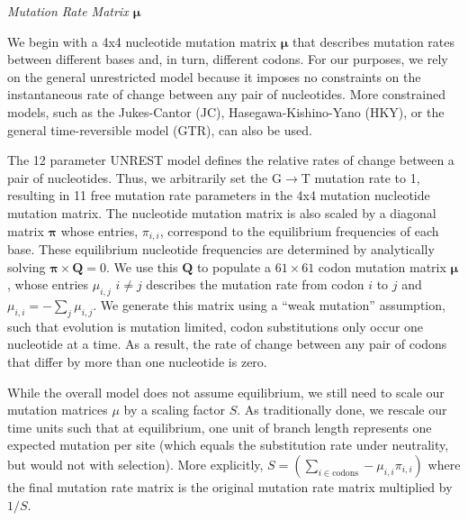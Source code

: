 \documentclass[12pt,letterpaper,fleqn]{article}
\renewcommand{\subsection}[1]{%
\bigskip
\begin{center}
\begin{large}
\normalfont\itshape #1
\end{large}
\end{center}}
\newcommand{\pimatrix}{\ensuremath{\boldsymbol{\pi}}\xspace}
\newcommand{\mumatrix}{\ensuremath{\boldsymbol{\mu}}\xspace}
\newcommand{\Qmatrix}{\ensuremath{\mathbf{Q}}\xspace}
\newcommand{\muij}{\ensuremath{\mu_{i,j}}\xspace}
\begin{document}
\subsection{Mutation Rate Matrix \mumatrix}
We begin with a 4x4 nucleotide mutation matrix \mumatrix that describes mutation rates between different bases and, in turn, different codons.
For our purposes, we rely on the general unrestricted model \citep[UNREST from ][]{Yang1994} because it imposes no constraints on the instantaneous rate of change between any pair of nucleotides.
More constrained models, such as the Jukes-Cantor (JC), Hasegawa-Kishino-Yano (HKY), or the general time-reversible model (GTR), can also be used.

The 12 parameter UNREST model defines the relative rates of change between a pair of nucleotides.
Thus, we arbitrarily set the G$\rightarrow$T mutation rate to 1, resulting in 11 free mutation rate parameters in the 4x4 mutation nucleotide mutation matrix.
The nucleotide mutation matrix is also scaled by a diagonal matrix \pimatrix whose entries, $\pi_{i,i}$, correspond to the equilibrium frequencies of each base.
These equilibrium nucleotide frequencies are determined by analytically solving $\pimatrix \times \Qmatrix = 0$.
We use this \Qmatrix to populate a $61 \times 61$ codon mutation matrix $\mumatrix$, whose entries $\muij$ $i\neq j$ describes the mutation rate from codon $i$ to $j$ and $\mu_{i,i} = - \sum_j \mu_{i,j}$.
We generate this matrix using a ``weak mutation'' assumption, such that evolution is mutation limited, codon substitutions only occur one nucleotide at a time.
As a result, the rate of change between any pair of codons that differ by more than one nucleotide is zero.

While the overall model does not assume equilibrium, we still need to scale our mutation matrices $\mu$ by a scaling factor $S$.
As traditionally done, we rescale our time units such that at equilibrium, one unit of branch length represents one expected mutation per site (which equals the substitution rate under neutrality, but would not with selection).
More explicitly, $ S = \left(\sum_{i \in \text{codons}} -\mu_{i,i} \pi_{i,i}\right)$ where the final mutation rate matrix is the original mutation rate matrix multiplied by $1/S$. 
\end{document}
